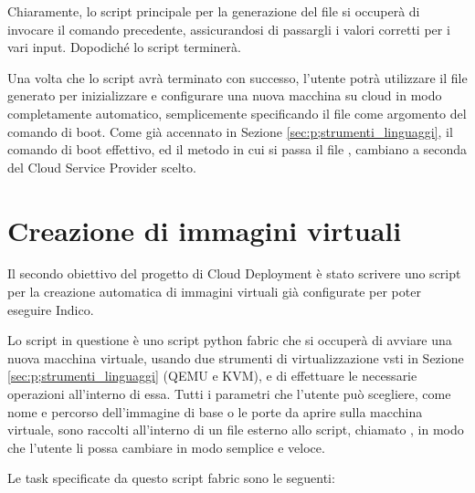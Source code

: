             Chiaramente, lo script principale per la generazione del file  si occuperà di invocare il comando precedente, assicurandosi di passargli i valori corretti per i vari input. Dopodiché lo script terminerà.
            
            Una volta che lo script avrà terminato con successo, l'utente potrà utilizzare il file  generato per inizializzare e configurare una nuova macchina su cloud in modo completamente automatico, semplicemente specificando il file  come argomento del comando di boot. Come già accennato in Sezione \ref{sec:p;strumenti_linguaggi}, il comando di boot effettivo, ed il metodo in cui si passa il file , cambiano a seconda del Cloud Service Provider scelto.

    \section{Creazione di immagini virtuali} \label{sec:cd;creazione_immagini_virtuali}
    
        Il secondo obiettivo del progetto di Cloud Deployment è stato scrivere uno script per la creazione automatica di immagini virtuali già configurate per poter eseguire Indico.
        
        Lo script in questione è uno script python fabric che si occuperà di avviare una nuova macchina virtuale, usando due strumenti di virtualizzazione vsti in Sezione \ref{sec:p;strumenti_linguaggi} (\ac{QEMU} e \ac{KVM}), e di effettuare le necessarie operazioni all'interno di essa. Tutti i parametri che l'utente può scegliere, come nome e percorso dell'immagine di base o le porte da aprire sulla macchina virtuale, sono raccolti all'interno di un file esterno allo script, chiamato , in modo che l'utente li possa cambiare in modo semplice e veloce.
        
        Le task specificate da questo script fabric sono le seguenti:
        
